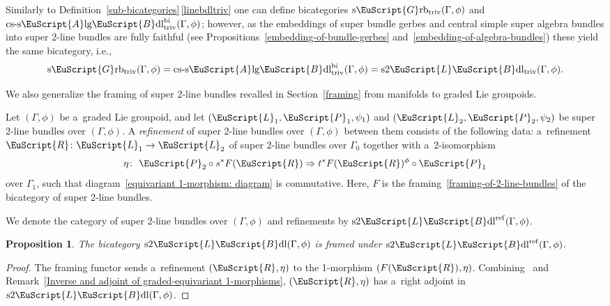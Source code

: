 \documentclass[10pt,a4paper]{amsart}
\numberwithin{equation}{section}
\newtheorem{Proposition}[Theorem]{Proposition}
 { \theoremstyle{definition}
\newtheorem{Definition}[Theorem]{Definition}
\newtheorem{Example}[Theorem]{Example}
\newtheorem{Remark}[Theorem]{Remark} }
\def\mathscr#1{\EuScript{#1}}
\newcommand{\LineBdl}{\mathscr{L}\mathscr{B}\mathrm{dl}}
\newcommand{\stwoLineBdl}{\mathrm{s}2\LineBdl}
\newcommand{\stwoLineBdltriv}{\mathrm{s}2\LineBdl_{\mathrm{triv}}}
\newcommand{\stwoLineBdlref}{\mathrm{s}2\LineBdl^{\mathrm{ref}}}
\newcommand{\Grbtriv}{\mathscr{G}\mathrm{rb}_{\mathrm{triv}}}
\newcommand{\sGrbtriv}{\mathrm{s}\Grbtriv}
\newcommand{\Alg}{\Incl\mathrm{lg}}
\newcommand{\cssAlg}{\mathrm{cs\text{-}s}\Alg}
\newcommand{\cssAlgBdlbi}{\cssAlg\mathscr{B}\mathrm{dl}^{\mathrm{bi}}}
\newcommand{\Incl}{\mathscr{A}}
\begin{document}
\begin{Remark}
\label{trivial-things}
Similarly to Definition~\ref{sub-bicategories}\,\ref{linebdltriv} one can define bicategories $\sGrbtriv(\Gamma,\phi)$ and $\cssAlgBdlbi_{\mathrm{triv}}(\Gamma,\phi)$; however, as the embeddings of super bundle gerbes and central simple super algebra bundles into super 2-line bundles are fully faithful (see Propositions~\ref{embedding-of-bundle-gerbes} and~\ref{embedding-of-algebra-bundles}) these yield the same bicategory, i.e.,
\begin{equation*}
\sGrbtriv(\Gamma,\phi) =\cssAlgBdlbi_{\mathrm{triv}}(\Gamma,\phi)= \stwoLineBdltriv(\Gamma,\phi).
\end{equation*}
\end{Remark}


We also generalize the framing of super 2-line bundles recalled in Section~\ref{framing} from manifolds to graded Lie groupoids.

\begin{Definition} \label{definition: refinement of a graded equivariant 2-line bundle}
 Let $(\Gamma,\phi)$ be a~graded Lie groupoid, and let $(\mathscr{L}_1,\mathscr{P}_1,\psi_1)$ and $(\mathscr{L}_2,\mathscr{P}_2,\psi_2)$
 be super 2-line bundles over $(\Gamma,\phi)$. A \emph{refinement} of super 2-line bundles over $(\Gamma,\phi)$
 between them consists of the following data: a~refinement $\mathscr{R}\colon \mathscr{L}_1 \to \mathscr{L}_2$
 of super 2-line bundles over $\Gamma_0$ together with a~2-isomorphism
 \[%
 \eta \colon\ \mathscr{P}_2 \circ s^*F(\mathscr{R}) \Rightarrow t^*F(\mathscr{R})^\phi \circ \mathscr{P}_1
 \]
 over $\Gamma_1$, such that diagram~\eqref{equivariant 1-morphism: diagram} is commutative.
 Here, $F$ is the framing~\eqref{framing-of-2-line-bundles} of the bicategory of super 2-line bundles.
\end{Definition}

We denote the category of super 2-line bundles over $(\Gamma,\phi)$ and refinements by $\stwoLineBdlref(\Gamma,\phi)$.
\begin{Proposition} \label{proposition: graded equivariant 2-line bundles are framed}
 The bicategory $\stwoLineBdl(\Gamma,\phi)$ is framed under $\stwoLineBdlref(\Gamma,\phi)$.
\end{Proposition}
\begin{proof}
 The framing functor sends a~refinement $(\mathscr{R},\eta)$ to the 1-morphism $(F(\mathscr{R}),\eta)$. Combining~\cite[Proposition~3.5.2]{Kristel2020}
 and Remark~\ref{Inverse and adjoint of graded-equivariant 1-morphisms}, $(\mathscr{R},\eta)$ has a~right adjoint in $\stwoLineBdl(\Gamma,\phi)$.
\end{proof}
\end{document}
